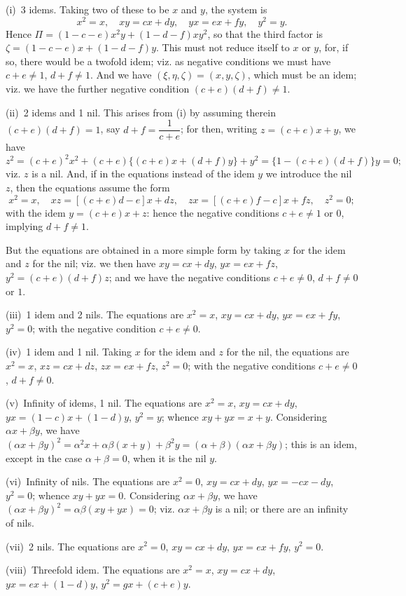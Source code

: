\documentclass[11pt,a4paper]{article}
\theoremstyle{plain}
\theoremstyle{definition}
\theoremstyle{remark}
\begin{document}
(i)~3 idems. Taking two of these to be $x$ and $y$, the system is
\[
x^2=x,\quad xy=cx+dy,\quad yx=ex+fy,\quad y^2=y.
\]
Hence $\Pi=(1-c-e)x^2y+(1-d-f)xy^2$, so that the third factor is $\zeta=(1-c-e)x+(1-d-f)y$. This must not reduce itself to $x$ or $y$, for, if so, there would be a twofold idem; viz. as negative conditions we must have $c+e\neq 1$, $d+f\neq 1$. And we have $(\xi,\eta,\zeta)=(x,y,\zeta)$, which must be an idem; viz. we have the further negative condition $(c+e)(d+f)\neq 1$.

(ii)~2 idems and 1 nil. This arises from (i) by assuming therein $(c+e)(d+f)=1$, say $d+f=\dfrac{1}{c+e}$; for then, writing $z=(c+e)x+y$, we have
\[
z^2=(c+e)^2x^2+(c+e)\{(c+e)x+(d+f)y\}+y^2=\{1-(c+e)(d+f)\}y=0;
\]
viz. $z$ is a nil. And, if in the equations instead of the idem $y$ we introduce the nil $z$, then the equations assume the form
\[
x^2=x,\quad xz=[(c+e)d-e]x+dz,\quad zx=[(c+e)f-c]x+fz,\quad z^2=0;
\]
with the idem $y=(c+e)x+z$: hence the negative conditions $c+e\neq 1$ or $0$, implying $d+f\neq 1$.

But the equations are obtained in a more simple form by taking $x$ for the idem and $z$ for the nil; viz. we then have $xy=cx+dy$, $yx=ex+fz$, $y^2=(c+e)(d+f)z$; and we have the negative conditions $c+e\neq 0$, $d+f\neq 0$ or $1$.

(iii)~1 idem and 2 nils. The equations are $x^2=x$, $xy=cx+dy$, $yx=ex+fy$, $y^2=0$; with the negative condition $c+e\neq 0$.

(iv)~1 idem and 1 nil. Taking $x$ for the idem and $z$ for the nil, the equations are $x^2=x$, $xz=cx+dz$, $zx=ex+fz$, $z^2=0$; with the negative conditions $c+e\neq 0$, $d+f\neq 0$.

(v)~Infinity of idems, 1 nil. The equations are $x^2=x$, $xy=cx+dy$, $yx=(1-c)x+(1-d)y$, $y^2=y$; whence $xy+yx=x+y$. Considering $\alpha x+\beta y$, we have $(\alpha x+\beta y)^2=\alpha^2x+\alpha\beta(x+y)+\beta^2y=(\alpha+\beta)(\alpha x+\beta y)$; this is an idem, except in the case $\alpha+\beta=0$, when it is the nil $y$.

(vi)~Infinity of nils. The equations are $x^2=0$, $xy=cx+dy$, $yx=-cx-dy$, $y^2=0$; whence $xy+yx=0$. Considering $\alpha x+\beta y$, we have $(\alpha x+\beta y)^2=\alpha\beta(xy+yx)=0$; viz. $\alpha x+\beta y$ is a nil; or there are an infinity of nils.

(vii)~2 nils. The equations are $x^2=0$, $xy=cx+dy$, $yx=ex+fy$, $y^2=0$.

(viii)~Threefold idem. The equations are $x^2=x$, $xy=cx+dy$, $yx=ex+(1-d)y$, $y^2=gx+(c+e)y$.
\end{document}
